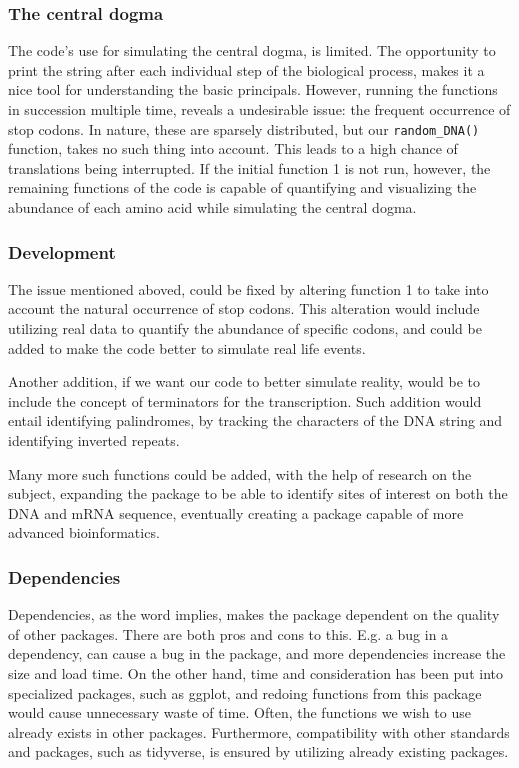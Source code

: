 \documentclass[
]{article}
\begin{document}
\subsubsection{The central dogma}\label{the-central-dogma}

The code's use for simulating the central dogma, is limited. The
opportunity to print the string after each individual step of the
biological process, makes it a nice tool for understanding the basic
principals. However, running the functions in succession multiple time,
reveals a undesirable issue: the frequent occurrence of stop codons. In
nature, these are sparsely distributed, but our \texttt{random\_DNA()}
function, takes no such thing into account. This leads to a high chance
of translations being interrupted. If the initial function 1 is not run,
however, the remaining functions of the code is capable of quantifying
and visualizing the abundance of each amino acid while simulating the
central dogma.

\subsubsection{Development}\label{development}

The issue mentioned aboved, could be fixed by altering function 1 to
take into account the natural occurrence of stop codons. This alteration
would include utilizing real data to quantify the abundance of specific
codons, and could be added to make the code better to simulate real life
events.

Another addition, if we want our code to better simulate reality, would
be to include the concept of terminators for the transcription. Such
addition would entail identifying palindromes, by tracking the
characters of the DNA string and identifying inverted repeats.

Many more such functions could be added, with the help of research on
the subject, expanding the package to be able to identify sites of
interest on both the DNA and mRNA sequence, eventually creating a
package capable of more advanced bioinformatics.

\subsubsection{Dependencies}\label{dependencies}

Dependencies, as the word implies, makes the package dependent on the
quality of other packages. There are both pros and cons to this. E.g. a
bug in a dependency, can cause a bug in the package, and more
dependencies increase the size and load time. On the other hand, time
and consideration has been put into specialized packages, such as
ggplot, and redoing functions from this package would cause unnecessary
waste of time. Often, the functions we wish to use already exists in
other packages. Furthermore, compatibility with other standards and
packages, such as tidyverse, is ensured by utilizing already existing
packages.
\end{document}
